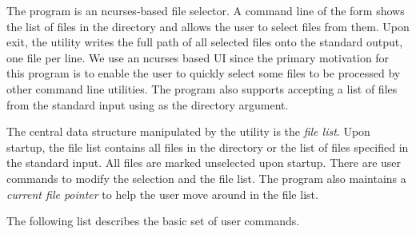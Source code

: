 The  program is an ncurses-based file selector. A command%
line of the form  shows the list of files in the
directory  and allows the user to select files from
them. Upon exit, the  utility writes the full path of all
selected files onto the standard output, one file per line.  We use an
ncurses based UI since the primary motivation for this program is to
enable the user to quickly select some files to be processed by other
command line utilities. The program also supports accepting a list of
files from the standard input using \unix{-} as the directory
argument.

The central data structure manipulated by the  utility is the
\emph{file list}. Upon startup, the file list contains all files in
the directory  or the list of files specified in the
standard input. All files are marked unselected upon startup. There
are user commands to modify the selection and the file list. The
program also maintains a \emph{current file pointer} to help the user
move around in the file list.

The following list describes the basic set of user commands.

